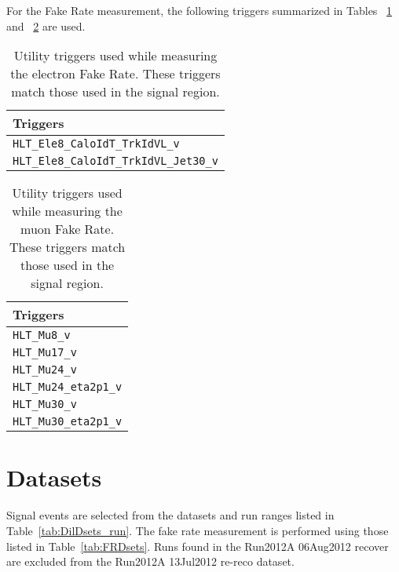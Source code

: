 For the Fake Rate measurement, the following triggers summarized in Tables ~\ref{tab:ElFRTriggers} and ~\ref{tab:MuFRTriggers} are used.\\
\begin{table}[h]
\caption{ \label{tab:ElFRTriggers} Utility triggers used while measuring the electron Fake Rate. These triggers match those used in the signal region.}
\begin{center}
\begin{tabular}{l} \hline \hline
        Triggers       \\ \hline
\verb=HLT_Ele8_CaloIdT_TrkIdVL_v=\\
\verb=HLT_Ele8_CaloIdT_TrkIdVL_Jet30_v= \\
\hline
\end{tabular}
\end{center}
\end{table}

  




\begin{table}[h]
\caption{ \label{tab:MuFRTriggers} Utility triggers used while measuring the muon Fake Rate. These triggers match those used in the signal region.}
\begin{center}
\begin{tabular}{l} \hline \hline
        Triggers       \\ \hline
\verb=HLT_Mu8_v=   \\
\verb=HLT_Mu17_v=   \\  
\verb=HLT_Mu24_v=  \\
\verb=HLT_Mu24_eta2p1_v= \\
\verb=HLT_Mu30_v=      \\
\verb=HLT_Mu30_eta2p1_v= \\ 
 \hline
\end{tabular}
\end{center}
\end{table}


\clearpage



\section{Datasets}
\label{sec:data_details:datasets}

Signal events are selected from the datasets and run ranges listed in Table~\ref{tab:DilDsets_run}.  The fake rate measurement is performed using those listed in Table~\ref{tab:FRDsets}.  Runs found in the Run2012A 06Aug2012 recover are excluded from the Run2012A 13Jul2012 re-reco dataset. 

